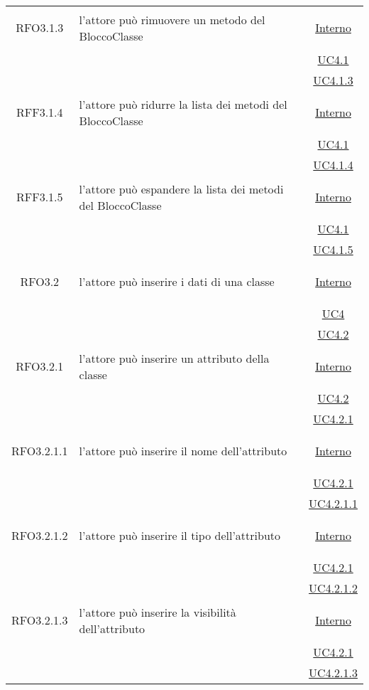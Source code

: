 \begin{longtable}{|c|>{\centering}m{7cm}|c|}
\hypertarget{RFO3.1.3}{RFO3.1.3} & l'attore può rimuovere un metodo del BloccoClasse & \hyperlink{Interno}{Interno}\\
& &\hyperref[UC4.1]{UC4.1}\\
& &\hyperref[UC4.1.3]{UC4.1.3}\\ \hline

\hypertarget{RFF3.1.4}{RFF3.1.4} & l'attore può ridurre la lista dei metodi del BloccoClasse & \hyperlink{Interno}{Interno}\\
& &\hyperref[UC4.1]{UC4.1}\\
& &\hyperref[UC4.1.4]{UC4.1.4}\\ \hline

\hypertarget{RFF3.1.5}{RFF3.1.5} & l'attore può espandere la lista dei metodi del BloccoClasse & \hyperlink{Interno}{Interno}\\
& &\hyperref[UC4.1]{UC4.1}\\
& &\hyperref[UC4.1.5]{UC4.1.5}\\ \hline

\hypertarget{RFO3.2}{RFO3.2} & l'attore può inserire i dati di una classe & \hyperlink{Interno}{Interno}\\
& &\hyperref[UC4]{UC4}\\
& &\hyperref[UC4.2]{UC4.2}\\ \hline

\hypertarget{RFO3.2.1}{RFO3.2.1} & l'attore può inserire un attributo della classe & \hyperlink{Interno}{Interno}\\
& &\hyperref[UC4.2]{UC4.2}\\
& &\hyperref[UC4.2.1]{UC4.2.1}\\ \hline

\hypertarget{RFO3.2.1.1}{RFO3.2.1.1} & l'attore può inserire il nome dell'attributo & \hyperlink{Interno}{Interno}\\
& &\hyperref[UC4.2.1]{UC4.2.1}\\
& &\hyperref[UC4.2.1.1]{UC4.2.1.1}\\ \hline

\hypertarget{RFO3.2.1.2}{RFO3.2.1.2} & l'attore può inserire il tipo dell'attributo & \hyperlink{Interno}{Interno}\\
& &\hyperref[UC4.2.1]{UC4.2.1}\\
& &\hyperref[UC4.2.1.2]{UC4.2.1.2}\\ \hline

\hypertarget{RFO3.2.1.3}{RFO3.2.1.3} & l'attore può inserire la visibilità dell'attributo & \hyperlink{Interno}{Interno}\\
& &\hyperref[UC4.2.1]{UC4.2.1}\\
& &\hyperref[UC4.2.1.3]{UC4.2.1.3}\\ \hline


\end{longtable}

